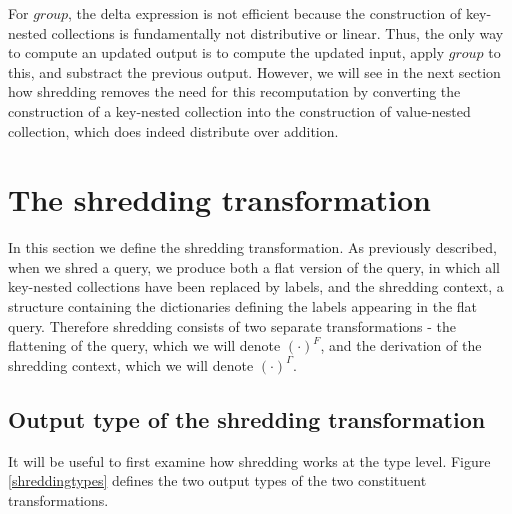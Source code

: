 {{{For $group$, the delta expression is not efficient because the construction of key-nested collections is fundamentally not distributive or linear. Thus, the only way to compute an updated output is to compute the updated input, apply $group$ to this, and substract the previous output. However, we will see in the next section how shredding removes the need for this recomputation by converting the construction of a key-nested collection into the construction of value-nested collection, which does indeed distribute over addition.
	
}

\section{The shredding transformation} {

In this section we define the shredding transformation. As previously described, when we shred a query, we produce both a flat version of the query, in which all key-nested collections have been replaced by labels, and the shredding context, a structure containing the dictionaries defining the labels appearing in the flat query. Therefore shredding consists of two separate transformations - the flattening of the query, which we will denote $(\cdot)^F$, and the derivation of the shredding context, which we will denote $(\cdot)^\Gamma$.

\subsection{Output type of the shredding transformation} {

It will be useful to first examine how shredding works at the type level. Figure \ref{shreddingtypes} defines the two output types of the two constituent transformations.

}}}}

